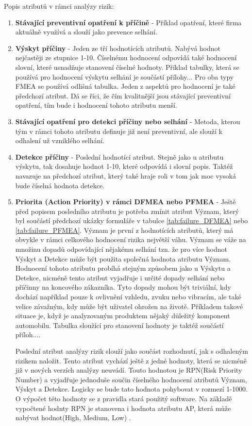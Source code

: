 Popis atributů v rámci analýzy rizik:
\begin{enumerate}
	\item \textbf{Stávající preventivní opatření k příčině} - Příklad opatření, které firma aktuálně využívá a slouží jako prevence selhání. 
	\item \textbf{Výskyt příčiny} - Jeden ze tří hodnotících atributů. Nabývá hodnot nejčastěji ze stupnice 1-10. Číselnému hodnocení odpovídá také hodnocení slovní, které usnadňuje stanovení číselné hodnoty. Příklad tabulky, která se používá pro hodnocení výskytu selhání je součástí přílohy... Pro oba typy FMEA se používá odlišná tabulka. Jeden z aspektů pro hodnocení je také předchozí atribut. Dá se říci, že čím kvalitnější jsou stávající preventivní opatření, tím bude i hodnocení tohoto atributu menší.     
	\item \textbf{Stávající opatření pro detekci příčiny nebo selhání} - Metoda, kterou tým v rámci tohoto atributu definuje již není preventivní, ale slouží k odhalení už vzniklého selhání. 
	\item \textbf{Detekce příčiny} - Poslední hodnotící atribut. Stejně jako u atributu výskytu, tak dosahuje hodnot 1-10, které odpovídá i slovní popis. Taktéž navazuje na předchozí atribut, který také hraje roli v tom jak moc vysoká bude číselná hodnota detekce. 
	\item \textbf{Priorita (Action Priority) v rámci DFMEA nebo PFMEA} - 
 Ještě před popisem posledního atributu je potřeba zmínit atribut Význam, který byl součástí předchozí ukázky formuláře v tabulce \ref{tab:failure_DFMEA} nebo \ref{tab:failure_PFMEA}. Význam je první z hodnotících atributů, který má obvykle v rámci celkového hodnocení rizika největší váhu. Význam se váže na množinu dopadů odpovídající nějakému selhání tzn. že pro více hodnot Výskyt a Detekce může být použita společná hodnota atributu Význam. Hodnocení tohoto atributu probíhá stejným způsobem jako u Výskytu a Detekce, nicméně tento atribut vyjadřuje i určité dopady selhání nebo příčinny na koncového zákazníka. Tyto dopady mohou být triviální, kdy dochází například pouze k ovlivnění vzhledu, zvuku nebo vibracím, ale také velice závažným, kdy může být uživatel ohrožen na životě. Příkladem takové situace je, když je analyzovaným produktem nějaký důležitý komponent automobilu. Tabulka sloužící pro stanovení hodnoty je taktéž součástí příloh....
 
 Poslední atribut analýzy rizik slouží jako součást rozhodnutí, jak s odhaleným rizikem naložit. Tento atribut vychází ještě z jedné hodnoty, která se nicméně již v nových verzích analýzy neuvádí. Touto hodnotou je RPN(Risk Priority Number) a vyjadřuje jednoduše součin číselného hodnocení atributů Význam, Výskyt a Detekce. Logicky se bude tato hodnota pohybovat v rozmezí 1-1000. O výpočet této hodnoty se z pravidla stará použitý software. Na základě vypočtené hodnty RPN je stanovena i hodnota atributu AP, která může nabývat hodnot(High, Medium, Low) .


\end{enumerate}

